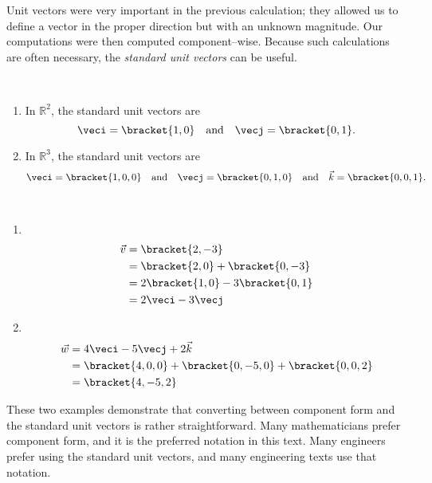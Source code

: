 Unit vectors were very important in the previous calculation; they allowed us to define a vector in the proper direction but with an unknown magnitude. Our computations were then computed component--wise. Because such calculations are often necessary, the \textit{standard unit vectors} can be useful.

{\mbox{}\\[-2\baselineskip]\begin{enumerate}
	\item In $\mathbb{R}^2$, the standard unit vectors are
	$$\veci =\bracket{1,0}\quad \text{and}\quad \vecj =\bracket{0,1}.$$
	\item In $\mathbb{R}^3$, the standard unit vectors are
	$$\veci =\bracket{1,0,0}\quad \text{and}\quad \vecj =\bracket{0,1,0}\quad \text{and}\quad \vec k =\bracket{0,0,1}.$$
\end{enumerate}}

{\mbox{}\\[-\baselineskip]\begin{enumerate}
	\item  \mbox{}\\[-2\baselineskip]
	\begin{align*}
		\vec v &=\bracket{2,-3}\\
		&=\bracket{2,0}+\bracket{0,-3}\\
		&= 2\bracket{1,0}-3\bracket{0,1}\\
		&= 2\veci - 3\vecj
	\end{align*}
	
	\item	\mbox{}\\[-2\baselineskip]
	\begin{align*}
		\vec w &= 4\veci - 5\vecj +2\vec k\\
		&=\bracket{4,0,0}+\bracket{0,-5,0}+\bracket{0,0,2}\\
		&=\bracket{4,-5,2}
	\end{align*}
\end{enumerate}
These two examples demonstrate that converting between component form and the standard unit vectors is rather straightforward. Many mathematicians prefer component form, and it is the preferred notation in this text. Many engineers prefer using the standard unit vectors, and many engineering texts use that notation.}

